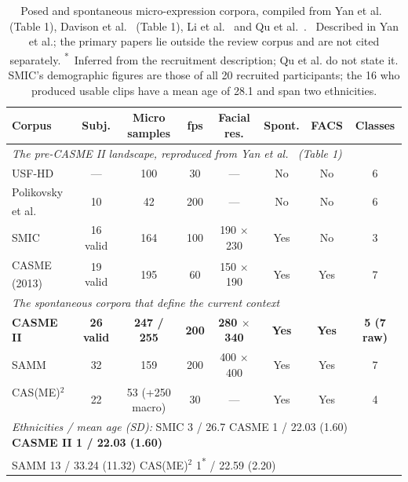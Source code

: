 \begin{table}[htbp]
	\centering
	\footnotesize
	\setlength{\tabcolsep}{4pt}
	\begin{tabular}{l c c c c c c c}
		\hline
		\textbf{Corpus} & \textbf{Subj.} & \textbf{Micro samples} & \textbf{fps} & \textbf{Facial res.} & \textbf{Spont.} & \textbf{FACS} & \textbf{Classes} \\
		\hline
		\multicolumn{8}{l}{\textit{The pre-CASME II landscape, reproduced from Yan et al.~\cite{yan2014} (Table 1)}} \\
		USF-HD~\cite{shreve2011}                       & ---      & 100 & 30  & ---              & No  & No  & 6 \\
		Polikovsky et al.\textsuperscript{\textdagger} & 10       & 42  & 200 & ---              & No  & No  & 6 \\
		SMIC~\cite{liX2013}                            & 16 valid & 164 & 100 & 190 $\times$ 230 & Yes & No  & 3 \\
		CASME (2013)\textsuperscript{\textdagger}      & 19 valid & 195 & 60  & 150 $\times$ 190 & Yes & Yes & 7 \\
		\hline
		\multicolumn{8}{l}{\textit{The spontaneous corpora that define the current context}} \\
		\textbf{CASME II}~\cite{yan2014} & \textbf{26 valid} & \textbf{247 / 255} & \textbf{200} & \textbf{280 $\times$ 340} & \textbf{Yes} & \textbf{Yes} & \textbf{5 (7 raw)} \\
		SAMM~\cite{davison2018}          & 32 & 159             & 200 & 400 $\times$ 400 & Yes & Yes & 7 \\
		CAS(ME)$^2$~\cite{qu2016}        & 22 & 53 (+250 macro) & 30  & ---              & Yes & Yes & 4 \\
		\hline
		\multicolumn{8}{l}{\textit{Ethnicities / mean age (SD):} SMIC 3 / 26.7 \quad CASME 1 / 22.03 (1.60) \quad \textbf{CASME II 1 / 22.03 (1.60)}} \\
		\multicolumn{8}{l}{\quad SAMM 13 / 33.24 (11.32) \quad CAS(ME)$^2$ 1\textsuperscript{*} / 22.59 (2.20)} \\
		\hline
	\end{tabular}
	\caption[Posed and spontaneous micro-expression corpora]{Posed and spontaneous micro-expression corpora, compiled from Yan et al.~\cite{yan2014} (Table 1), Davison et al.~\cite{davison2018} (Table 1), Li et al.~\cite{liX2013} and Qu et al.~\cite{qu2016}. \textdagger{}~Described in Yan et al.; the primary papers lie outside the review corpus and are not cited separately. \textsuperscript{*}~Inferred from the recruitment description; Qu et al. do not state it. SMIC's demographic figures are those of all 20 recruited participants; the 16 who produced usable clips have a mean age of 28.1 and span two ethnicities.}
	\label{tab:spontaneous-corpora}
\end{table}

